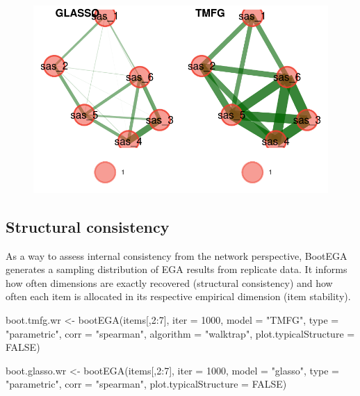 \documentclass[
  letterpaper,
  DIV=11,
  numbers=noendperiod]{scrreprt}
\newenvironment{Shaded}{\begin{snugshade}}{\end{snugshade}}
\newcommand{\AttributeTok}[1]{\textcolor[rgb]{0.40,0.45,0.13}{#1}}
\newcommand{\ConstantTok}[1]{\textcolor[rgb]{0.56,0.35,0.01}{#1}}
\newcommand{\DecValTok}[1]{\textcolor[rgb]{0.68,0.00,0.00}{#1}}
\newcommand{\FunctionTok}[1]{\textcolor[rgb]{0.28,0.35,0.67}{#1}}
\newcommand{\NormalTok}[1]{\textcolor[rgb]{0.00,0.23,0.31}{#1}}
\newcommand{\OtherTok}[1]{\textcolor[rgb]{0.00,0.23,0.31}{#1}}
\newcommand{\SpecialCharTok}[1]{\textcolor[rgb]{0.37,0.37,0.37}{#1}}
\newcommand{\StringTok}[1]{\textcolor[rgb]{0.13,0.47,0.30}{#1}}
\begin{document}
\begin{figure}[H]

{\centering \includegraphics{03_dimensionality-analysis_files/figure-pdf/ega-with-redundancy-1.pdf}

}

\end{figure}

\hypertarget{structural-consistency}{%
\subsection{Structural consistency}\label{structural-consistency}}

As a way to assess internal consistency from the network perspective,
BootEGA generates a sampling distribution of EGA results from replicate
data. It informs how often dimensions are exactly recovered (structural
consistency) and how often each item is allocated in its respective
empirical dimension (item stability).

\begin{Shaded}
\begin{Highlighting}[]
\NormalTok{boot.tmfg.wr }\OtherTok{\textless{}{-}} \FunctionTok{bootEGA}\NormalTok{(items[,}\DecValTok{2}\SpecialCharTok{:}\DecValTok{7}\NormalTok{], }\AttributeTok{iter =} \DecValTok{1000}\NormalTok{, }\AttributeTok{model =} \StringTok{"TMFG"}\NormalTok{, }\AttributeTok{type =} \StringTok{"parametric"}\NormalTok{, }\AttributeTok{corr =}  \StringTok{"spearman"}\NormalTok{, }\AttributeTok{algorithm =} \StringTok{"walktrap"}\NormalTok{, }\AttributeTok{plot.typicalStructure =} \ConstantTok{FALSE}\NormalTok{)}

\NormalTok{boot.glasso.wr }\OtherTok{\textless{}{-}} \FunctionTok{bootEGA}\NormalTok{(items[,}\DecValTok{2}\SpecialCharTok{:}\DecValTok{7}\NormalTok{], }\AttributeTok{iter =} \DecValTok{1000}\NormalTok{, }\AttributeTok{model =} \StringTok{"glasso"}\NormalTok{, }\AttributeTok{type =} \StringTok{"parametric"}\NormalTok{, }\AttributeTok{corr =}  \StringTok{"spearman"}\NormalTok{, }\AttributeTok{plot.typicalStructure =} \ConstantTok{FALSE}\NormalTok{)}
\end{Highlighting}
\end{Shaded}
\end{document}

